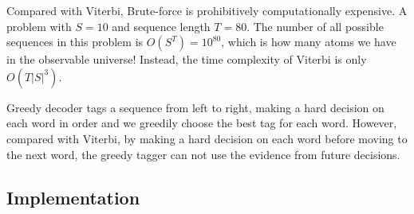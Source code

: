 Compared with Viterbi, Brute-force is prohibitively computationally expensive. A problem with $S=10$ and sequence length $T=80$. The number of all possible sequences in this problem is $O(S^T)=10^{80}$, which is how many atoms we have in the observable universe! Instead, the time complexity of Viterbi is only $O(T|S|^3)$.

Greedy decoder tags a sequence from left to right, making a hard decision on each word in order and we greedily choose the best tag for each word. However, compared with Viterbi, by making a hard decision on each word before moving to the next word, the greedy tagger can not use the evidence from future decisions.

\subsection{\textbf{Implementation}}

